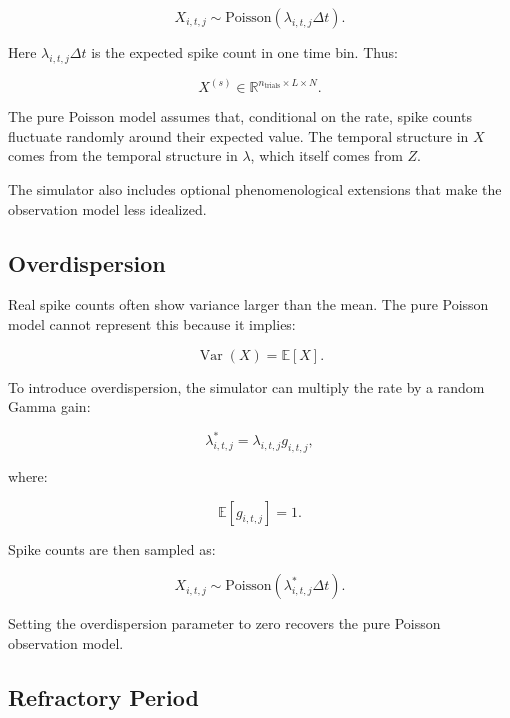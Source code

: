 \documentclass[11pt]{article}
\begin{document}
\begin{equation}
X_{i,t,j} \sim \text{Poisson}(\lambda_{i,t,j}\Delta t).
\end{equation}

Here $\lambda_{i,t,j}\Delta t$ is the expected spike count in one time bin.
Thus:

\begin{equation}
X^{(s)} \in
\mathbb{R}^{n_{\text{trials}} \times L \times N}.
\end{equation}

The pure Poisson model assumes that, conditional on the rate, spike counts
fluctuate randomly around their expected value. The temporal structure in $X$
comes from the temporal structure in $\lambda$, which itself comes from $Z$.

The simulator also includes optional phenomenological extensions that make the
observation model less idealized.

\subsection{Overdispersion}

Real spike counts often show variance larger than the mean. The pure Poisson
model cannot represent this because it implies:

\begin{equation}
\operatorname{Var}(X) = \mathbb{E}[X].
\end{equation}

To introduce overdispersion, the simulator can multiply the rate by a random
Gamma gain:

\begin{equation}
\lambda^{\ast}_{i,t,j} = \lambda_{i,t,j} g_{i,t,j},
\end{equation}

where:

\begin{equation}
\mathbb{E}[g_{i,t,j}] = 1.
\end{equation}

Spike counts are then sampled as:

\begin{equation}
X_{i,t,j} \sim \text{Poisson}(\lambda^{\ast}_{i,t,j}\Delta t).
\end{equation}

Setting the overdispersion parameter to zero recovers the pure Poisson
observation model.

\subsection{Refractory Period}
\end{document}
